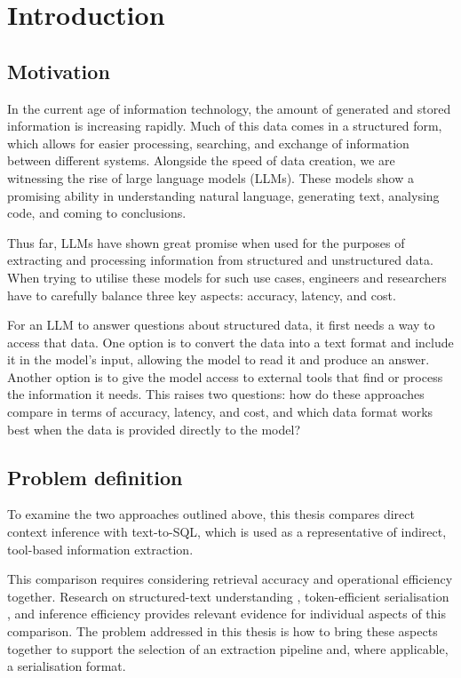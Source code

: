 \chapter{Introduction} \label{ch:introduction}

\section{Motivation}

In the current age of information technology, the amount of generated and stored information is increasing
rapidly. Much of this data comes in a structured form, which allows for easier processing, searching,
and exchange of information between different systems. Alongside the speed of data creation, we are
witnessing the rise of large language models (LLMs). These models show a promising ability in understanding
natural language, generating text, analysing code, and coming to conclusions.

Thus far, LLMs have shown great promise when used for the purposes of extracting and processing
information from structured and unstructured data. When trying to utilise these models for such use cases,
engineers and researchers have to carefully balance three key aspects: accuracy, latency, and cost.

For an LLM to answer questions about structured data, it first needs a way to access that data. One option
is to convert the data into a text format and include it in the model’s input, allowing the model to read it
and produce an answer. Another option is to give the model access to external tools that find or process the
information it needs. This raises two questions: how do these approaches compare in terms of accuracy,
latency, and cost, and which data format works best when the data is provided directly to the model?

\section{Problem definition}

To examine the two approaches outlined above, this thesis compares direct context inference with
text-to-SQL, which is used as a representative of indirect, tool-based information extraction.

This comparison requires considering retrieval accuracy and operational efficiency together.
Research on structured-text understanding \cite{struct-text-eval}, token-efficient serialisation
\cite{toon-format-2025}, and inference efficiency \cite{fernandez2025energy} provides relevant evidence for
individual aspects of this comparison. The problem addressed in this thesis is how to bring these aspects
together to support the selection of an extraction pipeline and, where applicable, a serialisation format.

